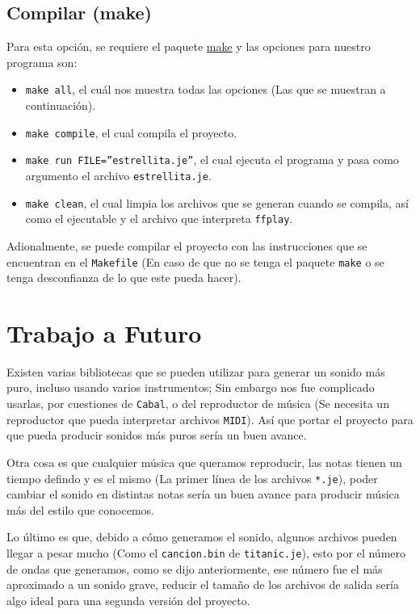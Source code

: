 \documentclass[10pt,a4paper]{article}
\begin{document}
\subsection{Compilar (make)}
Para esta opción, se requiere el paquete
\href{https://www.archlinux.org/packages/core/x86\_64/make/}{make} y las opciones
para nuestro programa son:

\begin{itemize}
\item \texttt{make all}, el cuál nos muestra todas las opciones (Las que se
  muestran a continuación).
\item \texttt{make compile}, el cual compila el proyecto.
\item \texttt{make run FILE=''estrellita.je''}, el cual ejecuta el programa y pasa
  como argumento el archivo \texttt{estrellita.je}.
\item \texttt{make clean}, el cual limpia los archivos que se generan cuando se
  compila, así como el ejecutable y el archivo que interpreta \texttt{ffplay}.
\end{itemize}

Adionalmente, se puede compilar el proyecto con las instrucciones que se
encuentran en el \texttt{Makefile} (En caso de que no se tenga el paquete
\texttt{make} o se tenga desconfianza de lo que este pueda hacer).

\section{Trabajo a Futuro}
\label{sec:TaF}
Existen varias bibliotecas\cite{paul} que se pueden utilizar para generar un
sonido más puro, incluso usando varios instrumentos; Sin embargo nos fue
complicado usarlas, por cuestiones de \texttt{Cabal}, o del reproductor de música
(Se necesita un reproductor que pueda interpretar archivos \texttt{MIDI}). Así
que portar el proyecto para que pueda producir sonidos más puros sería un buen
avance.

Otra cosa es que cualquier música que queramos reproducir, las notas tienen un
tiempo defindo y es el mismo (La primer línea de los archivos \texttt{*.je}),
poder cambiar el sonido en distintas notas sería un buen avance para producir
música más del estilo que conocemos.

Lo último es que, debido a cómo generamos el sonido, algunos archivos pueden
llegar a pesar mucho (Como el \texttt{cancion.bin} de \texttt{titanic.je}), esto
por el número de ondas que generamos, como se dijo anteriormente, ese número fue
el más aproximado a un sonido grave, reducir el tamaño de los archivos de salida
sería algo ideal para una segunda versión del proyecto.
\end{document}
